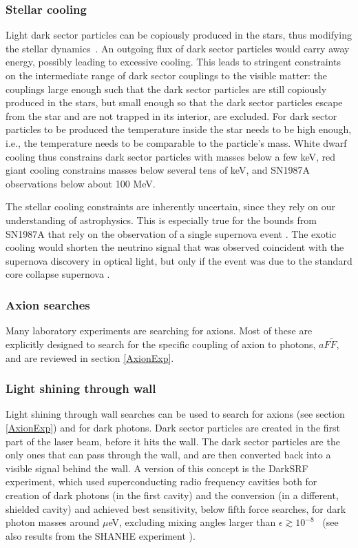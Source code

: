 \subsubsection{Stellar cooling} 
Light dark sector particles can be copiously produced in the stars, thus modifying the stellar dynamics~\cite{stellar:cooling}. An outgoing flux of dark sector particles would carry away energy, possibly leading to excessive cooling. This leads to stringent constraints on the intermediate range of dark sector couplings to the visible matter: the couplings large enough such that the dark sector particles are still copiously produced in the stars, but small enough so that the dark sector particles escape from the star and are not trapped in its interior, are excluded. For dark sector particles to be produced the temperature inside the star needs to be high enough, i.e., the temperature needs to be comparable to the particle's mass.
White dwarf cooling thus constrains  dark sector particles with masses below a few keV, red giant cooling constrains masses below several tens of keV, and SN1987A observations below about 100 MeV. 


The stellar cooling constraints are inherently uncertain, since they rely on our understanding of astrophysics. This is especially true for the bounds from SN1987A that rely on the observation of a single supernova event \cite{SN:constraints}. The exotic cooling would shorten the neutrino signal that was observed coincident with the supernova discovery in optical light, but only if the event was due to the standard core collapse supernova \cite{1907.05020}.



\subsubsection{Axion searches} 
Many laboratory experiments are searching for axions. Most of these are explicitly designed to search for the specific coupling of axion to photons, $a F\tilde F$, and are reviewed in section \ref{AxionExp}. 

\subsubsection{Light shining through wall} 
Light shining through wall searches can be used to search for axions (see section \ref{AxionExp}) and for dark photons. 
Dark sector particles are created in the first part of the laser beam, before it hits the wall. The dark sector particles are the only ones that can pass through the wall, and are then converted back into a visible signal behind the wall. A version of this concept is the {\sc DarkSRF} experiment, which used superconducting radio frequency cavities both for creation of dark photons (in the first cavity) and the conversion (in a different, shielded cavity) and achieved best sensitivity, below fifth force searches, for dark photon masses around $\mu$eV, excluding mixing angles larger than $\epsilon\gtrsim 10^{-8}$~\cite{Romanenko:2023irv} (see also results from the {\sc SHANHE} experiment \cite{SHANHE}). 


